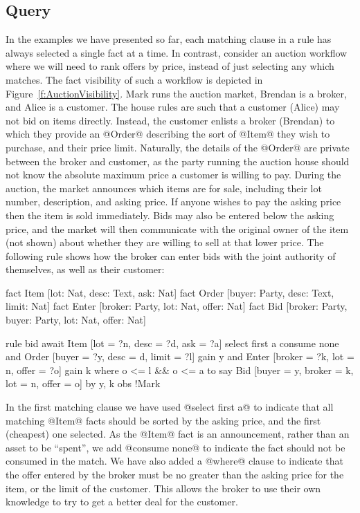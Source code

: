 \subsection{Query}
\label{s:Query}
In the examples we have presented so far, each matching clause in a rule has always selected a single fact at a time. In contrast, consider an auction workflow where we will need to rank offers by price, instead of just selecting any which matches. The fact visibility of such a workflow is depicted in Figure~\ref{f:AuctionVisibility}. Mark runs the auction market, Brendan is a broker, and Alice is a customer. The house rules are such that a customer (Alice) may not bid on items directly. Instead, the customer enlists a broker (Brendan) to which they provide an @Order@ describing the sort of @Item@ they wish to purchase, and their price limit. Naturally, the details of the @Order@ are private between the broker and customer, as the party running the auction house should not know the absolute maximum price a customer is willing to pay. During the auction, the market announces which items are for sale, including their lot number, description, and asking price. If anyone wishes to pay the asking price then the item is sold immediately. Bids may also be entered below the asking price, and the market will then communicate with the original owner of the item (not shown) about whether they are willing to sell at that lower price. The following rule shows how the broker can enter bids with the joint authority of themselves, as well as their customer:

\begin{small}
\begin{code}
fact Item  [lot: Nat, desc: Text, ask: Nat]
fact Order [buyer:  Party, desc: Text, limit: Nat]
fact Enter [broker: Party, lot: Nat, offer: Nat]
fact Bid  [broker: Party, buyer: Party, lot: Nat, offer: Nat]

  rule  bid
  await Item   [lot = ?n, desc = ?d, ask = ?a]
               select first a   consume none
    and Order  [buyer  = ?y, desc = d, limit = ?l] gain {y}
    and Enter  [broker = ?k, lot  = n, offer = ?o] gain {k}
         where o <= l && o <= a
  to
    say Bid    [buyer = y, broker = k, lot = n, offer = o]
     by {y, k} obs {!Mark}
\end{code}
\end{small}

In the first matching clause we have used @select first a@ to indicate that all matching @Item@ facts should be sorted by the asking price, and the first (cheapest) one selected. As the @Item@ fact is an announcement, rather than an asset to be ``spent'', we add @consume none@ to indicate the fact should not be consumed in the match. We have also added a @where@ clause to indicate that the offer entered by the broker must be no greater than the asking price for the item, or the limit of the customer. This allows the broker to use their own knowledge to try to get a better deal for the customer.

